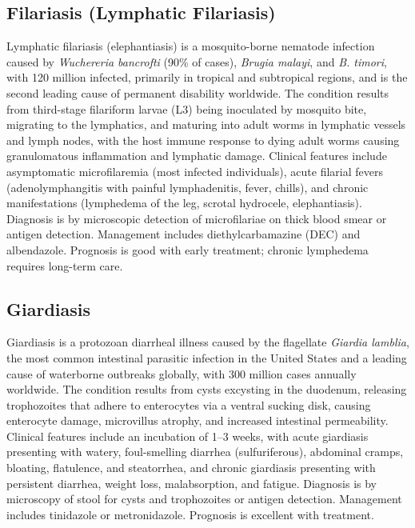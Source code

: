 \subsection{Filariasis (Lymphatic Filariasis)}
\label{sec:Filariasis}
Lymphatic filariasis (elephantiasis) is a mosquito-borne nematode infection caused by \textit{Wuchereria bancrofti} (90\% of cases), \textit{Brugia malayi}, and \textit{B. timori}, with 120 million infected, primarily in tropical and subtropical regions, and is the second leading cause of permanent disability worldwide. The condition results from third-stage filariform larvae (L3) being inoculated by mosquito bite, migrating to the lymphatics, and maturing into adult worms in lymphatic vessels and lymph nodes, with the host immune response to dying adult worms causing granulomatous inflammation and lymphatic damage. Clinical features include asymptomatic microfilaremia (most infected individuals), acute filarial fevers (adenolymphangitis with painful lymphadenitis, fever, chills), and chronic manifestations (lymphedema of the leg, scrotal hydrocele, elephantiasis). Diagnosis is by microscopic detection of microfilariae on thick blood smear or antigen detection. Management includes diethylcarbamazine (DEC) and albendazole. Prognosis is good with early treatment; chronic lymphedema requires long-term care.

\subsection{Giardiasis}
\label{sec:Giardiasis}
Giardiasis is a protozoan diarrheal illness caused by the flagellate \textit{Giardia lamblia}, the most common intestinal parasitic infection in the United States and a leading cause of waterborne outbreaks globally, with 300 million cases annually worldwide. The condition results from cysts excysting in the duodenum, releasing trophozoites that adhere to enterocytes via a ventral sucking disk, causing enterocyte damage, microvillus atrophy, and increased intestinal permeability. Clinical features include an incubation of 1--3 weeks, with acute giardiasis presenting with watery, foul-smelling diarrhea (sulfuriferous), abdominal cramps, bloating, flatulence, and steatorrhea, and chronic giardiasis presenting with persistent diarrhea, weight loss, malabsorption, and fatigue. Diagnosis is by microscopy of stool for cysts and trophozoites or antigen detection. Management includes tinidazole or metronidazole. Prognosis is excellent with treatment.


